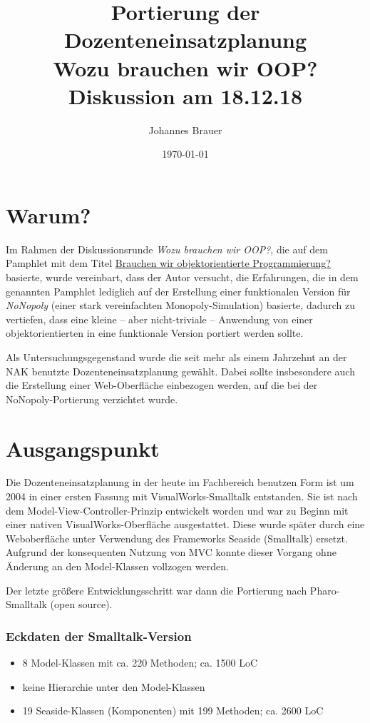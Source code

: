 \documentclass[11pt]{article}
\author{Johannes Brauer}
\date{\today}
\title{Portierung der Dozenteneinsatzplanung\\\medskip
\large Wozu brauchen wir OOP? Diskussion am 18.12.18}
\begin{document}
\maketitle
\section*{Warum?}
\label{sec:org6ae1840}
Im Rahmen der Diskussionsrunde \emph{Wozu brauchen wir OOP?}, die auf dem
Pamphlet mit dem Titel \href{https://www.dropbox.com/s/36vsbdk1bn4w17o/oop-wozu.pdf?dl=0}{Brauchen wir objektorientierte Programmierung?}
basierte, wurde vereinbart, dass der Autor versucht, die Erfahrungen, die in
dem genannten Pamphlet lediglich auf der Erstellung einer funktionalen
Version für \emph{NoNopoly} (einer stark vereinfachten Monopoly-Simulation)
basierte, dadurch zu vertiefen, dass eine kleine -- aber
nicht-triviale -- Anwendung von einer objektorientierten in
eine funktionale Version portiert werden sollte.

Als Untersuchungsgegenstand wurde die seit mehr als einem Jahrzehnt an
der NAK benutzte Dozenteneinsatzplanung gewählt. Dabei sollte
insbesondere auch die Erstellung einer Web-Oberfläche einbezogen
werden, auf die bei der NoNopoly-Portierung verzichtet wurde.
\section*{Ausgangspunkt}
\label{sec:org9624157}
Die Dozenteneinsatzplanung in der heute im Fachbereich benutzen Form
ist um 2004 in einer ersten Fassung mit VisualWorks-Smalltalk
entstanden. Sie ist nach dem Model-View-Controller-Prinzip entwickelt
worden und war zu Beginn mit einer nativen VisualWorks-Oberfläche
ausgestattet. Diese wurde später durch eine Weboberfläche unter
Verwendung des Frameworks Seaside (Smalltalk) ersetzt. Aufgrund
der konsequenten Nutzung von MVC konnte dieser Vorgang ohne Änderung
an den Model-Klassen vollzogen werden.

Der letzte größere Entwicklungsschritt war dann die Portierung nach
Pharo-Smalltalk (open source).
\subsubsection*{Eckdaten der Smalltalk-Version}
\label{sec:orgafbb9fc}
\begin{itemize}
\item 8 Model-Klassen mit ca. 220 Methoden; ca. 1500 LoC
\item keine Hierarchie unter den Model-Klassen
\item 19 Seaside-Klassen (Komponenten) mit 199 Methoden; ca. 2600 LoC
\end{itemize}
\end{document}
